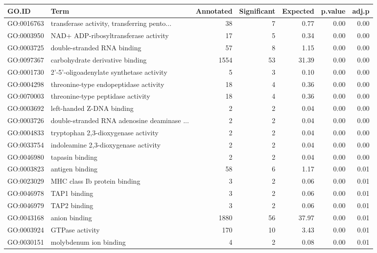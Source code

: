 \begin{table}[ht]
\centering
\begin{tabular}{llrrrrr}
  \hline
GO.ID & Term & Annotated & Significant & Expected & p.value & adj.p \\ 
  \hline
GO:0016763 & transferase activity, transferring pento... &  38 &   7 & 0.77 & 0.00 & 0.00 \\ 
  GO:0003950 & NAD+ ADP-ribosyltransferase activity &  17 &   5 & 0.34 & 0.00 & 0.00 \\ 
  GO:0003725 & double-stranded RNA binding &  57 &   8 & 1.15 & 0.00 & 0.00 \\ 
  GO:0097367 & carbohydrate derivative binding & 1554 &  53 & 31.39 & 0.00 & 0.00 \\ 
  GO:0001730 & 2'-5'-oligoadenylate synthetase activity &   5 &   3 & 0.10 & 0.00 & 0.00 \\ 
  GO:0004298 & threonine-type endopeptidase activity &  18 &   4 & 0.36 & 0.00 & 0.00 \\ 
  GO:0070003 & threonine-type peptidase activity &  18 &   4 & 0.36 & 0.00 & 0.00 \\ 
  GO:0003692 & left-handed Z-DNA binding &   2 &   2 & 0.04 & 0.00 & 0.00 \\ 
  GO:0003726 & double-stranded RNA adenosine deaminase ... &   2 &   2 & 0.04 & 0.00 & 0.00 \\ 
  GO:0004833 & tryptophan 2,3-dioxygenase activity &   2 &   2 & 0.04 & 0.00 & 0.00 \\ 
  GO:0033754 & indoleamine 2,3-dioxygenase activity &   2 &   2 & 0.04 & 0.00 & 0.00 \\ 
  GO:0046980 & tapasin binding &   2 &   2 & 0.04 & 0.00 & 0.00 \\ 
  GO:0003823 & antigen binding &  58 &   6 & 1.17 & 0.00 & 0.01 \\ 
  GO:0023029 & MHC class Ib protein binding &   3 &   2 & 0.06 & 0.00 & 0.01 \\ 
  GO:0046978 & TAP1 binding &   3 &   2 & 0.06 & 0.00 & 0.01 \\ 
  GO:0046979 & TAP2 binding &   3 &   2 & 0.06 & 0.00 & 0.01 \\ 
  GO:0043168 & anion binding & 1880 &  56 & 37.97 & 0.00 & 0.01 \\ 
  GO:0003924 & GTPase activity & 170 &  10 & 3.43 & 0.00 & 0.01 \\ 
  GO:0030151 & molybdenum ion binding &   4 &   2 & 0.08 & 0.00 & 0.01 \\ 

\end{tabular}
\end{table}
